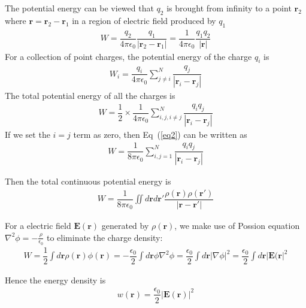 \documentclass[a4paper,11pt]{article}
\begin{document}
\begin{enumerate}
\begin{enumerate}
        The potential energy can be viewed that $q_2$ is brought from infinity to a point $\boldsymbol{r}_2$ where $\boldsymbol{r}=\boldsymbol{r}_2-\boldsymbol{r}_1$ in a region of electric field produced by $q_1$
        \begin{eqnarray}
            W=\dfrac{q_2}{4\pi\epsilon_0}\dfrac{q_1}{|\boldsymbol{r}_2-\boldsymbol{r}_1|}=\dfrac{1}{4\pi\epsilon_0}\dfrac{q_1q_2}{|\boldsymbol{r}|}
        \end{eqnarray}
        For a collection of point charges, the potential energy of the charge $q_i$ is 
        \begin{eqnarray}
            W_i=\dfrac{q_i}{4\pi\epsilon_0}\sum\limits_{j\neq i}^{N}\dfrac{q_j}{|\boldsymbol{r}_i-\boldsymbol{r}_j|}
        \end{eqnarray}
        The total potential energy of all the charges is 
        \begin{eqnarray}\label{eq2}
            W=\dfrac{1}{2}\times\dfrac{1}{4\pi\epsilon_0}\sum\limits_{i,j,i\neq j}^{N}\dfrac{q_iq_j}{|\boldsymbol{r}_i-\boldsymbol{r}_j|}
        \end{eqnarray}
        If we set the $i=j$ term as zero, then Eq~(\ref{eq2}) can be written as 
        \begin{eqnarray}
            W = \dfrac{1}{8\pi\epsilon_0}\sum\limits_{i,j=1}^{N}\dfrac{q_iq_j}{|\boldsymbol{r}_i-\boldsymbol{r}_j|}
        \end{eqnarray}

        Then the total continuous potential energy is 
        \begin{eqnarray}
            W=\dfrac{1}{8\pi\epsilon_0}\iint d\boldsymbol{r}d\boldsymbol{r}'\dfrac{\rho(\boldsymbol{r})\rho(\boldsymbol{r}')}{|\boldsymbol{r}-\boldsymbol{r}'|}
        \end{eqnarray}

        For a electric field $\boldsymbol{E}(\boldsymbol{r})$ generated by $\rho(\boldsymbol{r})$, we make use of Possion equation $\nabla^2\phi=-\frac{\rho}{\epsilon_0}$ to eliminate the charge density: 
        \begin{eqnarray}
            W=\dfrac{1}{2}\int d\boldsymbol{r}\rho(\boldsymbol{r})\phi(\boldsymbol{r})=-\dfrac{\epsilon_0}{2}\int d\boldsymbol{r}\phi\nabla^2\phi=\dfrac{\epsilon_0}{2}\int d\boldsymbol{r}|\nabla\phi|^2=\dfrac{\epsilon_0}{2}\int d\boldsymbol{r}|\boldsymbol{E}(\boldsymbol{r}|^2
        \end{eqnarray}
        
        Hence the energy density is 
        \begin{eqnarray}
            w(\boldsymbol{r}) = \dfrac{\epsilon_0}{2}|\boldsymbol{E}(\boldsymbol{r})|^2
        \end{eqnarray}


\end{enumerate}
\end{enumerate}
\end{document}
